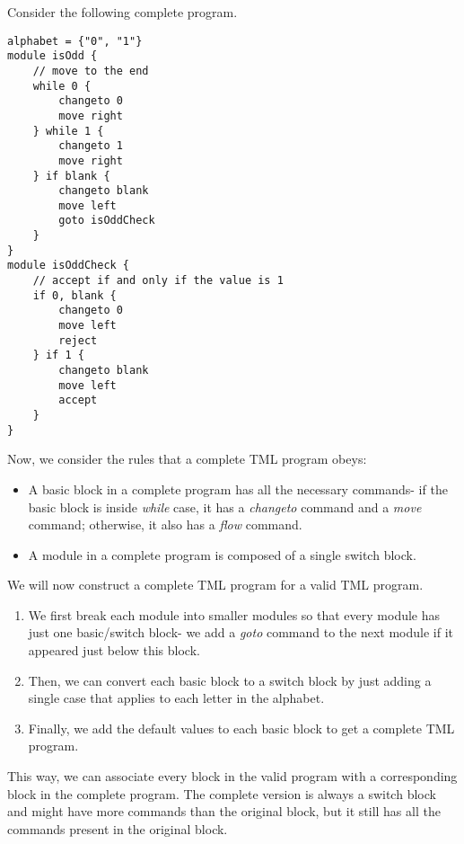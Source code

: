 \begin{appendices}
Consider the following complete program.
\begin{lstlisting}[language=TML]
alphabet = {"0", "1"}
module isOdd {
    // move to the end
    while 0 {
        changeto 0
        move right
    } while 1 {
        changeto 1
        move right
    } if blank {
        changeto blank
        move left
        goto isOddCheck
    }
}
module isOddCheck {
    // accept if and only if the value is 1
    if 0, blank {
        changeto 0
        move left
        reject
    } if 1 {
        changeto blank
        move left
        accept
    }
}
\end{lstlisting}
Now, we consider the rules that a complete TML program obeys:
\begin{itemize}
    \item A basic block in a complete program has all the necessary commands- if the basic block is inside \textit{while} case, it has a \textit{changeto} command and a \textit{move} command; otherwise, it also has a \textit{flow} command.
    \item A module in a complete program is composed of a single switch block.
\end{itemize}

We will now construct a complete TML program for a valid TML program.
\begin{enumerate}
    \item We first break each module into smaller modules so that every module has just one basic/switch block- we add a \textit{goto} command to the next module if it appeared just below this block.
    \item Then, we can convert each basic block to a switch block by just adding a single case that applies to each letter in the alphabet.
    \item Finally, we add the default values to each basic block to get a complete TML program.
\end{enumerate}
This way, we can associate every block in the valid program with a corresponding block in the complete program. The complete version is always a switch block and might have more commands than the original block, but it still has all the commands present in the original block. 


\end{appendices}
